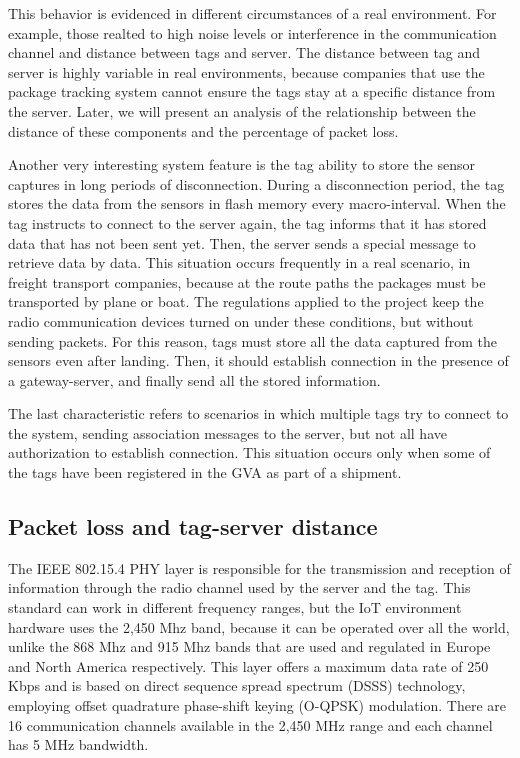 \documentclass[journal]{IEEEtran}	%
\begin{document}
This behavior is evidenced in different circumstances of a real environment. For example, those realted to high noise levels or interference in the communication channel and distance between tags and server. The distance between tag and server is highly variable in real environments, because companies that use the package tracking system cannot ensure the tags stay at a specific distance from the server. Later, we will present an analysis of the relationship between the distance of these components and the percentage of packet loss.

Another very interesting system feature is the tag ability to store the sensor captures in long periods of disconnection. During a disconnection period, the tag stores the data from the sensors in flash memory every macro-interval. When the tag instructs to connect to the server again, the tag informs that it has stored data that has not been sent yet. Then, the server sends a special message to retrieve data by data. This situation occurs frequently in a real scenario, in freight transport companies, because at the route paths the packages must be transported by plane or boat. The regulations applied to the project keep the radio communication devices turned on under these conditions, but without sending packets. For this reason,  tags must store all the data captured from the sensors even after landing. Then, it should establish connection in the presence of a gateway-server, and finally send all the stored information.

The last characteristic refers to scenarios in which multiple tags try to connect to the system, sending association messages to the server, but not all have authorization to establish connection. This situation occurs only when some of the tags have been registered in the GVA as part of a shipment.


\subsection{Packet loss and tag-server distance}


The IEEE 802.15.4 PHY layer is responsible for the transmission and reception of information through the radio channel used by the server and the tag. This standard can work in different frequency ranges, but the IoT environment hardware uses the 2,450 Mhz band, because it can be operated over all the world, unlike the 868 Mhz and 915 Mhz bands that are used and regulated in Europe and North America respectively. This layer offers a maximum data rate of 250 Kbps and is based on direct sequence spread spectrum (DSSS) technology, employing offset quadrature phase-shift keying (O-QPSK) modulation. There are 16 communication channels available in the 2,450 MHz range and each channel has 5 MHz bandwidth.
\end{document}
